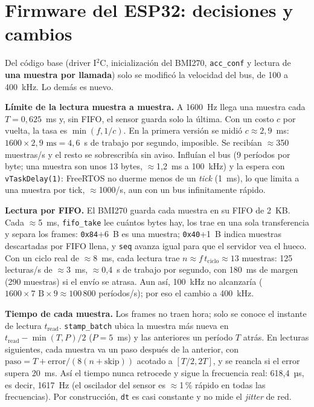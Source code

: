 \documentclass[11pt,a4paper]{report}
\begin{document}
\chapter{Firmware del ESP32: decisiones y cambios}\label{cap:firmware}
Del código base (driver I$^2$C, inicialización del BMI270, \texttt{acc\_conf} y lectura de \textbf{una muestra por llamada}) solo se modificó la velocidad del bus, de 100 a 400~kHz. Lo demás es nuevo.

\textbf{Límite de la lectura muestra a muestra.} A 1600~Hz llega una muestra cada $T=0{,}625$~ms y, sin FIFO, el sensor guarda solo la última. Con un costo $c$ por vuelta, la tasa es $\min(f, 1/c)$. En la primera versión se midió $c\approx2{,}9$~ms: $1600\times2{,}9\text{ ms}=4{,}6$~s de trabajo por segundo, imposible. Se recibían $\approx$350 muestras/s y el resto se sobrescribía sin aviso. Influían el bus (9 períodos por byte; una muestra son unos 13 bytes, $\approx$1,2~ms a 100~kHz) y la espera con \texttt{vTaskDelay(1)}: FreeRTOS no duerme menos de un \textit{tick} (1~ms), lo que limita a una muestra por tick, $\approx$1000/s, aun con un bus infinitamente rápido.

\textbf{Lectura por FIFO.} El BMI270 guarda cada muestra en su FIFO de 2~KB. Cada $\approx$5~ms, \texttt{fifo\_take} lee cuántos bytes hay, los trae en una sola transferencia y separa los frames: \texttt{0x84}+6~B es una muestra; \texttt{0x40}+1~B indica muestras descartadas por FIFO llena, y \texttt{seq} avanza igual para que el servidor vea el hueco. Con un ciclo real de $\approx$8~ms, cada lectura trae $n\approx f\,t_\text{ciclo}\approx13$ muestras: 125 lecturas/s de $\approx$3~ms, $\approx$0,4~s de trabajo por segundo, con 180~ms de margen (290 muestras) si el envío se atrasa. Aun así, 100~kHz no alcanzaría ($1600\times7\text{ B}\times9\approx100\,800$ períodos/s); por eso el cambio a 400~kHz.

\textbf{Tiempo de cada muestra.} Los frames no traen hora; solo se conoce el instante de lectura $t_\text{read}$. \texttt{stamp\_batch} ubica la muestra más nueva en $t_\text{read}-\min(T,P)/2$ ($P=5$~ms) y las anteriores un período $T$ atrás. En lecturas siguientes, cada muestra va un paso después de la anterior, con $\text{paso}=T+\text{error}/(8(n+\text{skip}))$ acotado a $[T/2,2T]$, y se reancla si el error supera 20~ms. Así el tiempo nunca retrocede y sigue la frecuencia real: 618,4~µs, es decir, 1617~Hz (el oscilador del sensor es $\approx$1\,\% rápido en todas las frecuencias). Por construcción, \texttt{dt} es casi constante y no mide el \textit{jitter} de red.
\end{document}
